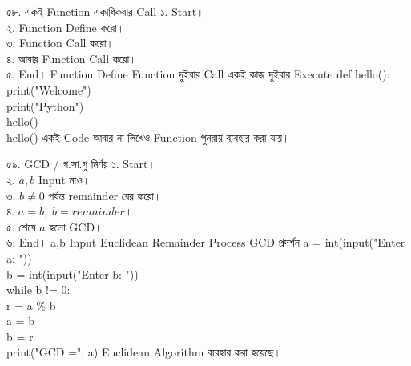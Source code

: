 
\exerciseTable
{৫৮. একই Function একাধিকবার Call}
{
১. Start।\\
২. Function Define করো।\\
৩. Function Call করো।\\
৪. আবার Function Call করো।\\
৫. End।
}
{
\linearflow
{Function Define}
{Function দুইবার Call}
{একই কাজ দুইবার Execute}
}
{
def hello():\\
\hspace*{4mm}print("Welcome")\\
\hspace*{4mm}print("Python")\\
hello()\\
hello()
}
{
একই Code আবার না লিখেও Function পুনরায় ব্যবহার করা যায়।
}




\exerciseTable
{৫৯. GCD / গ.সা.গু নির্ণয়}
{
১. Start।\\
২. \(a,b\) Input নাও।\\
৩. \(b\neq0\) পর্যন্ত remainder বের করো।\\
৪. \(a=b,\;b=remainder\)।\\
৫. শেষে \(a\) হলো GCD।\\
৬. End।
}
{
\linearflow
{a,b Input}
{Euclidean Remainder Process}
{GCD প্রদর্শন}
}
{
a = int(input("Enter a: "))\\
b = int(input("Enter b: "))\\
while b != 0:\\
\hspace*{4mm}r = a \% b\\
\hspace*{4mm}a = b\\
\hspace*{4mm}b = r\\
print("GCD =", a)
}
{
Euclidean Algorithm ব্যবহার করা হয়েছে।
}


